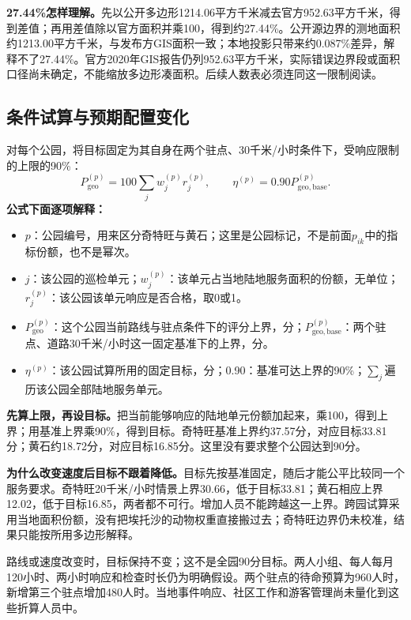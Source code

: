 \documentclass[12pt,a4paper]{article}
\numberwithin{equation}{section}
\begin{document}
\noindent\textbf{27.44\%怎样理解。}先以公开多边形1214.06平方千米减去官方952.63平方千米，得到差值；再用差值除以官方面积并乘100，得到约27.44\%。公开源边界的测地面积约1213.00平方千米，与发布方GIS面积一致；本地投影只带来约0.087\%差异，解释不了27.44\%。官方2020年GIS报告仍列952.63平方千米，实际错误边界段或面积口径尚未确定，不能缩放多边形凑面积。后续人数表必须连同这一限制阅读。

\clearpage

\subsection{条件试算与预期配置变化}
对每个公园，将目标固定为其自身在两个驻点、30千米/小时条件下，受响应限制的上限的90\%：
\begin{equation}
P_{\mathrm{geo}}^{(p)}=100\sum_jw_j^{(p)}r_j^{(p)},\qquad
\eta^{(p)}=0.90P_{\mathrm{geo,base}}^{(p)}.
\label{eq:transfertarget}
\end{equation}
\noindent\textbf{公式下面逐项解释：}
\begin{itemize}
\item $p$：公园编号，用来区分奇特旺与黄石；这里是公园标记，不是前面$p_{ik}$中的指标份额，也不是幂次。
\item $j$：该公园的巡检单元；$w_j^{(p)}$：该单元占当地陆地服务面积的份额，无单位；$r_j^{(p)}$：该公园该单元响应是否合格，取0或1。
\item $P_{\mathrm{geo}}^{(p)}$：这个公园当前路线与驻点条件下的评分上界，分；$P_{\mathrm{geo,base}}^{(p)}$：两个驻点、道路30千米/小时这一固定基准下的上界，分。
\item $\eta^{(p)}$：该公园试算所用的固定目标，分；0.90：基准可达上界的90\%；$\sum_j$遍历该公园全部陆地服务单元。
\end{itemize}
\noindent\textbf{先算上限，再设目标。}把当前能够响应的陆地单元份额加起来，乘100，得到上界；用基准上界乘90\%，得到目标。奇特旺基准上界约37.57分，对应目标33.81分；黄石约18.72分，对应目标16.85分。这里没有要求整个公园达到90分。

\noindent\textbf{为什么改变速度后目标不跟着降低。}目标先按基准固定，随后才能公平比较同一个服务要求。奇特旺20千米/小时情景上界30.66，低于目标33.81；黄石相应上界12.02，低于目标16.85，两者都不可行。增加人员不能跨越这一上界。跨园试算采用当地面积份额，没有把埃托沙的动物权重直接搬过去；奇特旺边界仍未校准，结果只能按所用多边形解释。

路线或速度改变时，目标保持不变；这不是全园90分目标。两人小组、每人每月120小时、两小时响应和检查时长仍为明确假设。两个驻点的待命预算为960人时，新增第三个驻点增加480人时。当地事件响应、社区工作和游客管理尚未量化到这些折算人员中。
\end{document}
